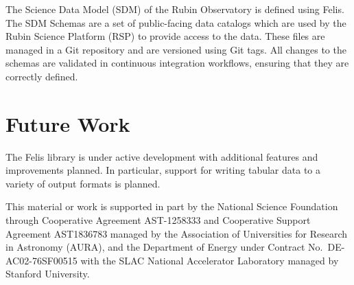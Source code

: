 \documentclass[11pt,twoside]{article}
\begin{document}
The Science Data Model (SDM) of the Rubin Observatory \citep[e.g.,][]{LSE-163} is defined using Felis.
The SDM Schemas are a set of public-facing data catalogs which are used by the Rubin Science Platform (RSP) to provide access to the data.
These files are managed in a Git repository and are versioned using Git tags.
All changes to the schemas are validated in continuous integration workflows, ensuring that they are correctly defined.

\section{Future Work}

The Felis library is under active development with additional features and improvements planned.
In particular, support for writing tabular data to a variety of output formats is planned.

\acknowledgments This material or work is supported in part by the National Science Foundation through Cooperative Agreement AST-1258333 and Cooperative Support Agreement AST1836783 managed by the Association of Universities for Research in Astronomy (AURA), and the Department of Energy under Contract No.\ DE-AC02-76SF00515 with the SLAC National Accelerator Laboratory managed by Stanford University.


\end{document}
